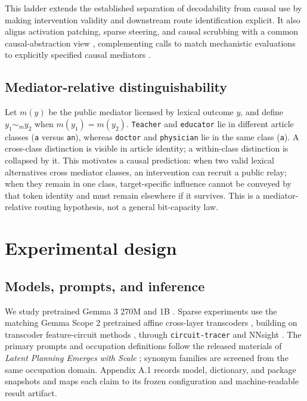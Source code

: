 \documentclass[
]{article}
\begin{document}
This ladder extends the established separation of decodability from
causal use \citep{ma2026plan} by making intervention validity and
downstream route identification explicit. It also aligns activation
patching, sparse steering, and causal scrubbing with a common
causal-abstraction view
\citep{geiger2025abstraction, chan2022scrubbing}, complementing calls to
match mechanistic evaluations to explicitly specified causal mediators
\citep{mueller2026mediator}.

\subsection{Mediator-relative
distinguishability}\label{mediator-relative-distinguishability}

Let \(m(y)\) be the public mediator licensed by lexical outcome \(y\),
and define \(y_1\sim_m y_2\) when \(m(y_1)=m(y_2)\). \texttt{Teacher}
and \texttt{educator} lie in different article classes (\texttt{a}
versus \texttt{an}), whereas \texttt{doctor} and \texttt{physician} lie
in the same class (\texttt{a}). A cross-class distinction is visible in
article identity; a within-class distinction is collapsed by it. This
motivates a causal prediction: when two valid lexical alternatives cross
mediator classes, an intervention can recruit a public relay; when they
remain in one class, target-specific influence cannot be conveyed by
that token identity and must remain elsewhere if it survives. This is a
mediator-relative routing hypothesis, not a general bit-capacity law.

\section{Experimental design}\label{experimental-design}

\subsection{Models, prompts, and
inference}\label{models-prompts-and-inference}

We study pretrained Gemma 3 270M and 1B \citep{gemma3}. Sparse
experiments use the matching Gemma Scope 2 pretrained affine cross-layer
transcoders \citep{gemmascope2}, building on transcoder feature-circuit
methods \citep{dunefsky2024transcoders, ameisen2025attribution}, through
\texttt{circuit-tracer} \citep{hanna2025circuittracer} and NNsight
\citep{fiotto2025nnsight}. The primary prompts and occupation
definitions follow the released materials of \emph{Latent Planning
Emerges with Scale} \citep{hanna2026latent}; synonym families are
screened from the same occupation domain. Appendix A.1 records model,
dictionary, and package snapshots and maps each claim to its frozen
configuration and machine-readable result artifact.
\end{document}
